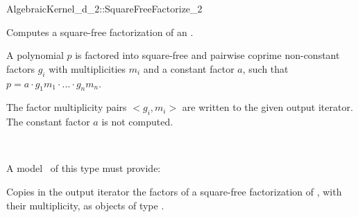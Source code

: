 \begin{ccRefFunctionObjectConcept}{AlgebraicKernel_d_2::SquareFreeFactorize_2}

\ccDefinition
Computes a square-free factorization of an
.

A polynomial $p$ is factored into square-free and pairwise 
coprime non-constant factors $g_i$ with multiplicities $m_i$ 
and a constant factor $a$, such that 
$p = a  \cdot  g_1m_1  \cdot  ...  \cdot  g_nm_n$.

The factor multiplicity pairs $<g_i,m_i>$ are written to the 
given output iterator. The constant factor $a$ is not computed. 

\ccRefines 
{}\\

\ccOperations
{}

A model \ccVar\ of this type must provide:

{Copies in the output iterator the factors of a square-free 
factorization of , with their multiplicity, as objects of type 
.}

\ccSeeAlso
{}\\
\\

\end{ccRefFunctionObjectConcept}
